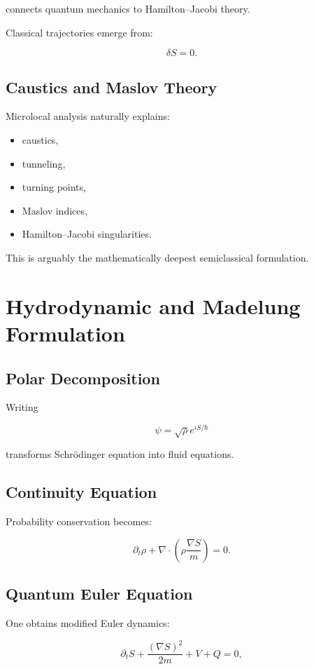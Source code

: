 \documentclass[11pt]{article}
\begin{document}
connects quantum mechanics to Hamilton--Jacobi theory.

Classical trajectories emerge from:

\[
\delta S = 0.
\]

\subsection{Caustics and Maslov Theory}

Microlocal analysis naturally explains:

\begin{itemize}
\item caustics,
\item tunneling,
\item turning points,
\item Maslov indices,
\item Hamilton--Jacobi singularities.
\end{itemize}

This is arguably the mathematically deepest semiclassical formulation.

\section{Hydrodynamic and Madelung Formulation}

\subsection{Polar Decomposition}

Writing

\[
\psi
=
\sqrt{\rho}
e^{iS/\hbar}
\]

transforms Schr\"odinger equation into fluid equations.

\subsection{Continuity Equation}

Probability conservation becomes:

\[
\partial_t \rho
+
\nabla\cdot
\left(
\rho
\frac{\nabla S}{m}
\right)
=
0.
\]

\subsection{Quantum Euler Equation}

One obtains modified Euler dynamics:

\[
\partial_t S
+
\frac{(\nabla S)^2}{2m}
+
V
+
Q
=
0,
\]
\end{document}
